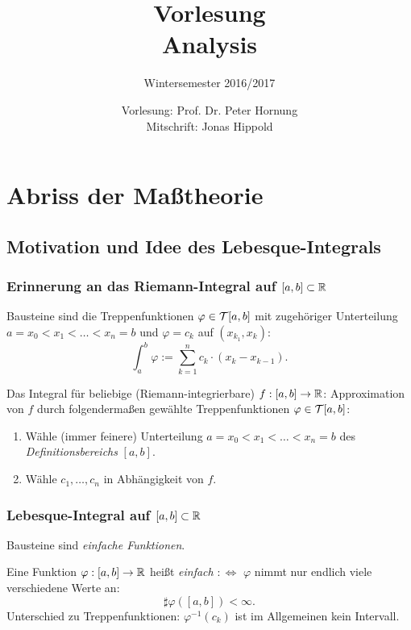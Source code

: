 \documentclass[
 a4paper,
 12pt,
 parskip=half
 ]{scrartcl}
\title{Vorlesung\\Analysis}
\subtitle{Wintersemester 2016/2017}
\author{Vorlesung: Prof. Dr. Peter Hornung\\Mitschrift: Jonas Hippold}
\theoremstyle{plain}
\theoremstyle{definition}
\numberwithin{equation}{section}
\begin{document}
\maketitle

\tableofcontents

\clearpage

\setcounter{section}{10}
\section{Abriss der Maßtheorie}
\subsection*{Motivation und Idee des Lebesque-Integrals}
\subsubsection*{Erinnerung an das Riemann-Integral auf $[a,b] \subset \mathbb{R}$}
Bausteine sind die Treppenfunktionen $\varphi \in \mathcal{T}[a,b]$ mit zugehöriger Unterteilung $a = x_0 < x_1 < \ldots < x_n = b$ und $\varphi = c_k$ auf $(x_{k_1},x_k)$:
\[ \int_a^b \varphi := \sum_{k=1}^n c_k \cdot (x_k - x_{k-1}). \]

Das Integral für beliebige (Riemann-integrierbare) $f:[a,b]\to\mathbb{R}$: Approximation von $f$ durch folgendermaßen gewählte Treppenfunktionen $\varphi \in \mathcal{T}[a,b]$:
\begin{enumerate}
 \item Wähle (immer feinere) Unterteilung $a = x_0 < x_1 < \ldots < x_n = b$ des \emph{Definitionsbereichs} $[a,b]$.
 \item Wähle $c_1, \ldots, c_n$ in Abhängigkeit von $f$.
\end{enumerate}

\subsubsection*{Lebesque-Integral auf $[a,b] \subset \mathbb{R}$}
Bausteine sind \emph{einfache Funktionen}.

Eine Funktion $\varphi: [a,b] \to \mathbb{R}$ heißt \emph{einfach} $:\Leftrightarrow$ $\varphi$ nimmt nur endlich viele verschiedene Werte an:
\[ \sharp \varphi([a,b]) < \infty. \]
Unterschied zu Treppenfunktionen: $\varphi^{-1}(c_k)$ ist im Allgemeinen kein Intervall.
\end{document}
